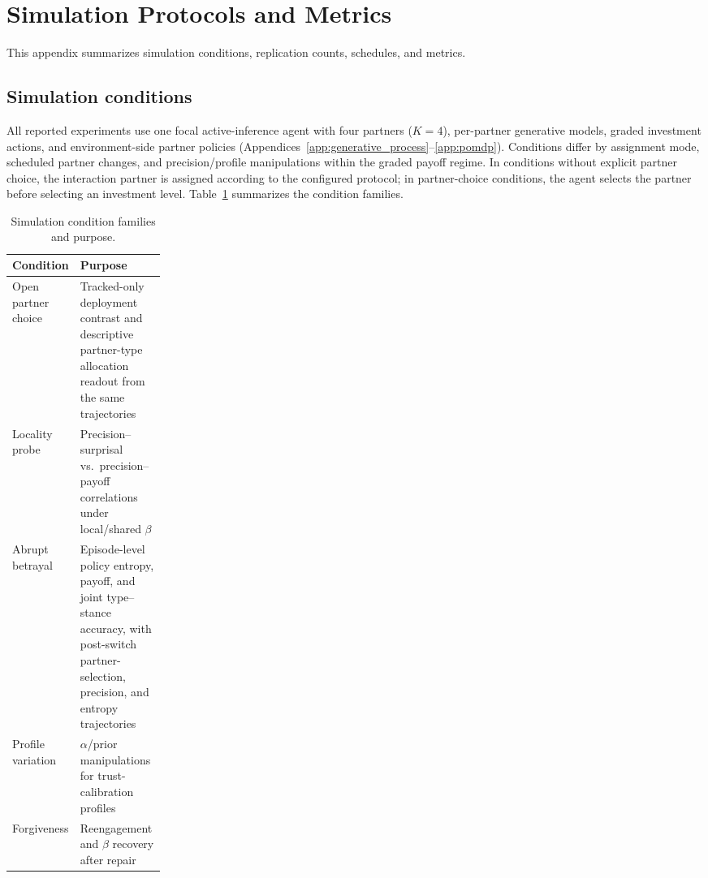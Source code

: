 \section{Simulation Protocols and Metrics}
\label{app:protocols}

This appendix summarizes simulation conditions, replication counts, schedules, and metrics.

\subsection{Simulation conditions}

All reported experiments use one focal active-inference agent with four partners (\(K=4\)), per-partner generative models, graded investment actions, and environment-side partner policies (Appendices~\ref{app:generative_process}--\ref{app:pomdp}). Conditions differ by assignment mode, scheduled partner changes, and precision/profile manipulations within the graded payoff regime. In conditions without explicit partner choice, the interaction partner is assigned according to the configured protocol; in partner-choice conditions, the agent selects the partner before selecting an investment level. Table~\ref{tab:simulation_conditions} summarizes the condition families.

\begin{table}[H]
\centering
\small
\caption{Simulation condition families and purpose.}
\label{tab:simulation_conditions}
\begin{tabularx}{\linewidth}{@{}>{\raggedright\arraybackslash}p{0.22\linewidth}X@{}}
\toprule
Condition & Purpose \\
\midrule
Open partner choice & Tracked-only deployment contrast and descriptive partner-type allocation readout from the same trajectories \\
Locality probe & Precision--surprisal vs.\ precision--payoff correlations under local/shared $\beta$ \\
Abrupt betrayal & Episode-level policy entropy, payoff, and joint type--stance accuracy, with post-switch partner-selection, precision, and entropy trajectories \\
Profile variation & $\alpha$/prior manipulations for trust-calibration profiles \\
Forgiveness & Reengagement and $\beta$ recovery after repair \\
\bottomrule
\end{tabularx}
\end{table}

